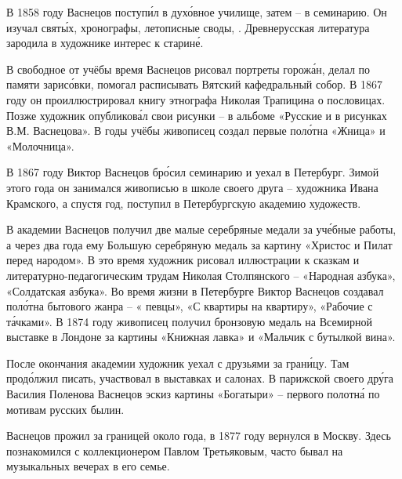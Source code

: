 В 1858 году Васнецов поступ\'{и}л в дух\'{о}вное училище, затем -- в семинарию. Он изучал  свят\'{ы}х, хронографы, летописные своды, . Древнерусская литература зародила в художнике интерес к старин\'{е}.

В свободное от учёбы время Васнецов рисовал портреты горож\'{а}н, делал по памяти зарис\'{о}вки, помогал расписывать Вятский кафедральный собор. В 1867 году он проиллюстрировал книгу этнографа Николая Трапицина о пословицах. Позже художник опубликов\'{а}л свои рисунки  -- в альбоме «Русские  и  в рисунках В.М. Васнецова». В годы учёбы живописец создал первые пол\'{о}тна «Жница» и «Молочница».

В 1867 году Виктор Васнецов бр\'{о}сил семинарию и уехал в Петербург. Зимой этого года он занимался живописью в школе своего друга -- художника Ивана Крамского, а спустя год, поступил в Петербургскую академию художеств.

В академии Васнецов получил две малые серебряные медали за уч\'{е}бные работы, а через два года ему  Большую серебряную медаль за картину «Христос и Пилат перед народом». В это время художник рисовал иллюстрации к сказкам и литературно-педагогическим трудам Николая Столпянского -- «Народная азбука», «Солдатская азбука». Во время жизни в Петербурге Виктор Васнецов создавал пол\'{о}тна бытового жанра -- « певцы», «С квартиры на квартиру», «Рабочие с т\'{а}чками». В 1874 году живописец получил бронзовую медаль на Всемирной выставке в Лондоне за картины «Книжная лавка» и «Мальчик с бутылкой вина».

После окончания академии художник уехал с друзьями за гран\'{и}цу. Там прод\'{о}лжил писать, участвовал в выставках и салонах. В парижской  своего др\'{у}га Василия Поленова Васнецов  эскиз картины «Богатыри» -- первого полотн\'{а} по мотивам русских былин.

Васнецов прожил за границей около года, в 1877 году вернулся в Москву. Здесь познакомился с коллекционером Павлом Третьяковым, часто бывал на музыкальных вечерах в его семье.

